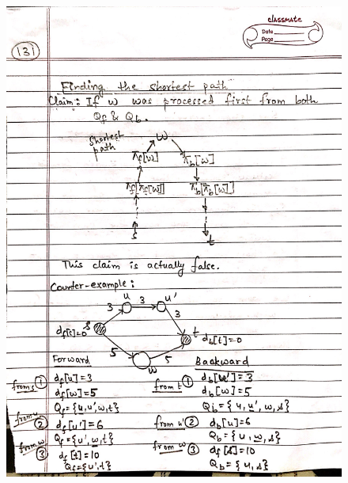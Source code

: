 \begin{figure}[H]
    \centering
    \includegraphics[width=16cm, height=21cm]{"./MIT-6.006/MIT-6006-131"}
\end{figure}
\newpage
